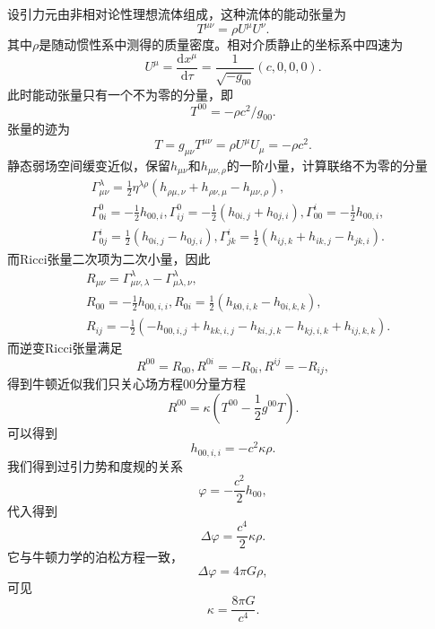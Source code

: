 \documentclass[11pt, a4paper, oneside, onecolumn]{ctexart}
\numberwithin{equation}{subsection}
\begin{document}
设引力元由非相对论性理想流体组成，这种流体的能动张量为
\begin{equation}
T^{\mu\nu}=\rho U^{\mu}U^{\nu}.
\end{equation}
其中$\rho$是随动惯性系中测得的质量密度。相对介质静止的坐标系中四速为
\begin{equation}
U^{\mu}=\frac{\mathrm{d}x^{\mu}}{\mathrm{d}\tau}=\frac{1}{\sqrt{-g_{00}}}\left(c,0,0,0\right).
\end{equation}
此时能动张量只有一个不为零的分量，即
\begin{equation}
T^{00}=-\rho c^{2}/g_{00}.
\end{equation}
张量的迹为
\begin{equation}
T=g_{\mu\nu}T^{\mu\nu}=\rho U^{\mu}U_{\mu}=-\rho c^{2}.
\end{equation}
静态弱场空间缓变近似，保留$h_{\mu\nu}$和$h_{\mu\nu,\rho}$的一阶小量，计算联络不为零的分量
\begin{align}
&\Gamma_{\mu\nu}^{\lambda}=\frac12\eta^{\lambda\rho}\left(h_{\rho\mu,\nu}+h_{\rho\nu,\mu}-h_{\mu\nu,\rho}\right),\\
&\Gamma_{0i}^{0}=-\frac12h_{00,i},\Gamma_{ij}^{0}=-\frac12\left(h_{0i,j}+h_{0j,i}\right),\Gamma_{00}^{i}=-\frac12h_{00,i},\\
&\Gamma_{0j}^{i}=\frac12\left(h_{0i,j}-h_{0j,i}\right),\Gamma_{jk}^{i}=\frac12\left(h_{ij,k}+h_{ik,j}-h_{jk,i}\right).
\end{align}
而Ricci张量二次项为二次小量，因此
\begin{align}
&R_{\mu\nu}=\Gamma_{\mu\nu,\lambda}^{\lambda}-\Gamma_{\mu\lambda,\nu}^{\lambda},\\
&R_{00}=-\frac12h_{00,i,i},R_{0i}=\frac12\left(h_{k0,i,k}-h_{0i,k,k}\right),\\
&R_{ij}=-\frac12\left(-h_{00,i,j}+h_{kk,i,j}-h_{ki,j,k}-h_{kj,i,k}+h_{ij,k,k}\right).
\end{align}
而逆变Ricci张量满足
\begin{equation}
R^{00}=R_{00},R^{0i}=-R_{0i},R^{ij}=-R_{ij},
\end{equation}
得到牛顿近似我们只关心场方程00分量方程
\begin{equation}
R^{00}=\kappa\left(T^{00}-\frac12g^{00}T\right).
\end{equation}
可以得到
\begin{equation}
h_{00,i,i}=-c^{2}\kappa\rho.
\end{equation}
我们得到过引力势和度规的关系
\begin{equation}
\varphi=-\frac{c^{2}}{2}h_{00},
\end{equation}
代入得到
\begin{equation}
\Delta{}\varphi=\frac{c^{4}}{2}\kappa\rho.
\end{equation}
它与牛顿力学的泊松方程一致，
\begin{equation}
\Delta{}\varphi=4\pi G\rho,
\end{equation}
可见
\begin{equation}
\kappa=\frac{8\pi G}{c^{4}}.
\end{equation}
\end{document}
